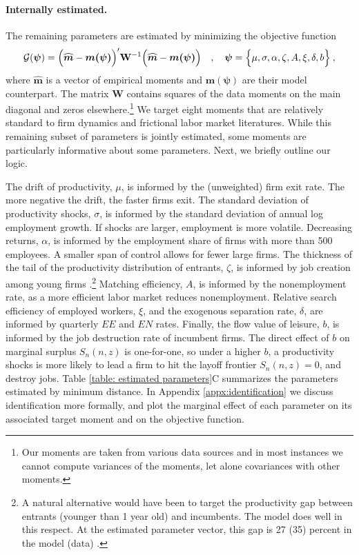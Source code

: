\paragraph{Internally estimated.}
The remaining parameters are estimated by minimizing the objective function
\vspace*{-.3cm}\begin{equation*}
\mathcal{G}(\bm{\psi})=\Big(\bm{\widehat{m}}-\bm{m(\psi)}\Big)'\mathbf{W}^{-1}
\Big(\bm{\widehat{m}}-\bm{m(\psi)}\Big)
\quad,\quad
\bm{\psi} = \Big\{\mu,\sigma,\alpha,\zeta,A,\xi,\delta,b\Big\}\:,
\vspace*{-.3cm}\end{equation*}
where $\bm{\widehat{m}}$ is a vector of empirical moments and $\bm{m(\psi)}$ are their model counterpart.
The matrix $\mathbf{W}$ contains squares of the data moments on the main diagonal and zeros elsewhere.\footnote{
    Our moments are taken from various data sources and in most instances we cannot compute variances of the moments, let alone covariances with other moments.}
We target eight moments that are relatively standard to firm dynamics and frictional labor market literatures.
While this remaining subset of parameters is jointly estimated, some moments are particularly informative about some parameters. Next, we briefly outline our logic.

The drift of productivity, $\mu$, is informed by the (unweighted) firm exit rate.
The more negative the drift, the faster firms exit.
The standard deviation of productivity shocks, $\sigma$, is informed by the standard deviation of annual log employment growth.
If shocks are larger, employment is more volatile.
Decreasing returns, $\alpha$, is informed by the employment share of firms with more than 500 employees.
A smaller span of control allows for fewer large firms.
The thickness of the tail of the productivity distribution of entrants, $\zeta$, is informed by job creation among young firms \citep{decker2020}.\footnote{
    A natural alternative would have been to target the productivity gap between entrants (younger than 1 year old) and incumbents. The model does well in this respect. At the estimated parameter vector, this gap is 27 (35) percent in the model (data) \citep{Gavazza2018}.}
Matching efficiency, $A$, is informed by the nonemployment rate, as a more efficient labor market reduces nonemployment.
Relative search efficiency of employed workers, $\xi$, and the exogenous separation rate, $\delta$, are informed by quarterly $EE$ and $EN$ rates.
Finally, the flow value of leisure, $b$, is informed by the job destruction rate of incumbent firms.
The direct effect of $b$ on marginal surplus $S_n(n,z)$ is one-for-one, so under a higher $b$, a productivity shocks is more likely to lead a firm to hit the layoff frontier $S_n(n,z)=0$, and destroy jobs.
Table \ref{table: estimated parameters}C summarizes the parameters estimated by minimum distance.
In Appendix \ref{appx:identification} we discuss identification more formally, and plot the marginal effect of each parameter on its associated target moment and on the objective function.


